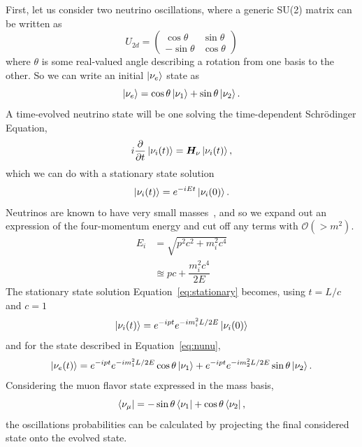 \documentclass[main.tex]{subfiles}
\begin{document}
First, let us consider two neutrino oscillations, where a generic SU(2) matrix can be written as 
\begin{equation}
    U_{2d}=\left(\begin{array}{cc} \cos\theta & \sin\theta \\ -\sin\theta & \cos\theta \end{array}\right)
\end{equation}
where $\theta$ is some real-valued angle describing a rotation from one basis to the other. So we can write an initial $\left| \nu_{e} \right >$ state as 
\begin{equation}\label{eq:nunu}
    \left| \nu_{e} \right > = \cos\theta \left| \nu_{1} \right > + \sin\theta \left| \nu_{2} \right >.
\end{equation}
A time-evolved neutrino state will be one solving the time-dependent Schr\"odinger Equation,
\begin{equation}
    i\dfrac{\partial}{\partial t} \left| \nu_{i} (t) \right > = \bm{H}_{\nu}\left| \nu_{i}(t) \right >,
\end{equation}
which we can do with a stationary state solution
\begin{equation}\label{eq:stationary}
    \left| \nu_{i} (t) \right >  =  e^{-iEt} \left| \nu_{i} (0) \right >.
\end{equation}
Neutrinos are known to have very small masses~\cite{KATRIN:2021uub}, and so we expand out an expression of the four-momentum energy and cut off any terms with $\mathcal{O}(>m^{2})$. 
\begin{align}
    E_{i} &= \sqrt{p^{2}c^{2} + m_{i}^{2}c^{4}} \\
    &\approxeq pc + \dfrac{m_{i}^{2}c^{4}}{2E}
\end{align}
The stationary state solution Equation~\eqref{eq:stationary} becomes, using $t=L/c$ and $c=1$ 
\begin{equation}
    \left| \nu_{i} (t) \right >  =  e^{-ipt}e^{ -im_{i}^{2}L/2E}\left| \nu_{i} (0) \right >
\end{equation}
and for the state described in Equation~\eqref{eq:nunu},
\begin{equation}
    \left| \nu_{e}(t) \right > = e^{-ipt}e^{ -im_{1}^{2}L/2E} \cos\theta \left| \nu_{1} \right >  + e^{-ipt}e^{ -im_{2}^{2}L/2E} \sin\theta \left| \nu_{2} \right >.
\end{equation}
Considering the muon flavor state expressed in the mass basis,
\begin{equation}
    \left< \nu_{\mu} \right | = -\sin\theta\left< \nu_{1} \right | + \cos\theta\left< \nu_{2} \right |,
\end{equation}
the oscillations probabilities can be calculated by projecting the final considered state onto the evolved state.
\end{document}
